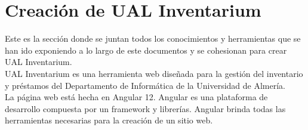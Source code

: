 \section{Creación de UAL Inventarium}\label{sec:4_web}
Este es la sección donde se juntan todos los conocimientos y herramientas que se han ido exponiendo a lo largo de este documentos y se cohesionan para crear UAL Inventarium.
\\UAL Inventarium es una herramienta web diseñada para la gestión del inventario y préstamos del Departamento de Informática de la Universidad de Almería.
\\La página web está hecha en Angular 12. Angular es una plataforma de desarrollo compuesta por un framework y librerías. Angular brinda todas las herramientas necesarias para la creación de un sitio web.






















